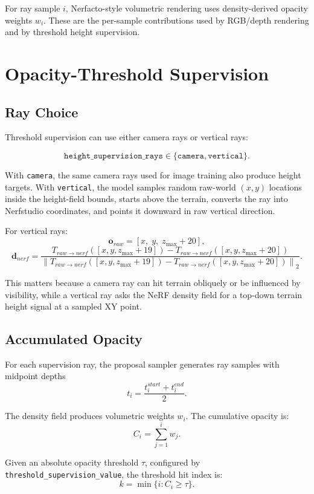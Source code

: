 \documentclass[11pt]{article}
\begin{document}
For ray sample \(i\), Nerfacto-style volumetric rendering uses density-derived opacity weights \(w_i\). These are the per-sample contributions used by RGB/depth rendering and by threshold height supervision.

\section{Opacity-Threshold Supervision}

\subsection{Ray Choice}

Threshold supervision can use either camera rays or vertical rays:

\[
  \texttt{height\_supervision\_rays} \in \{\texttt{camera},\texttt{vertical}\}.
\]

With \texttt{camera}, the same camera rays used for image training also produce height targets. With \texttt{vertical}, the model samples random raw-world \((x,y)\) locations inside the height-field bounds, starts above the terrain, converts the ray into Nerfstudio coordinates, and points it downward in raw vertical direction.

For vertical rays:
\[
  \mathbf{o}_{raw} = [x,\;y,\;z_{\max}+20],
\]
\[
  \mathbf{d}_{nerf} =
  \frac{
    T_{raw\rightarrow nerf}([x,y,z_{\max}+19]) -
    T_{raw\rightarrow nerf}([x,y,z_{\max}+20])
  }{
    \left\|
    T_{raw\rightarrow nerf}([x,y,z_{\max}+19]) -
    T_{raw\rightarrow nerf}([x,y,z_{\max}+20])
    \right\|_2
  }.
\]

This matters because a camera ray can hit terrain obliquely or be influenced by visibility, while a vertical ray asks the NeRF density field for a top-down terrain height signal at a sampled XY point.

\subsection{Accumulated Opacity}

For each supervision ray, the proposal sampler generates ray samples with midpoint depths
\[
  t_i = \frac{t_i^{start}+t_i^{end}}{2}.
\]

The density field produces volumetric weights \(w_i\). The cumulative opacity is:
\[
  C_i = \sum_{j=1}^{i} w_j.
\]

Given an absolute opacity threshold \(\tau\), configured by \texttt{threshold\_supervision\_value}, the threshold hit index is:
\[
  k = \min \{ i : C_i \ge \tau \}.
\]
\end{document}

